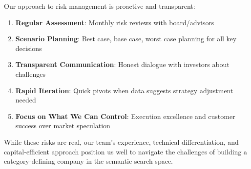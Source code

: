 Our approach to risk management is proactive and transparent:
\begin{enumerate}
    \item \textbf{Regular Assessment}: Monthly risk reviews with board/advisors
    \item \textbf{Scenario Planning}: Best case, base case, worst case planning for all key decisions
    \item \textbf{Transparent Communication}: Honest dialogue with investors about challenges
    \item \textbf{Rapid Iteration}: Quick pivots when data suggests strategy adjustment needed
    \item \textbf{Focus on What We Can Control}: Execution excellence and customer success over market speculation
\end{enumerate}

\vspace{0.3cm}
While these risks are real, our team's experience, technical differentiation, and capital-efficient approach position us well to navigate the challenges of building a category-defining company in the semantic search space.
